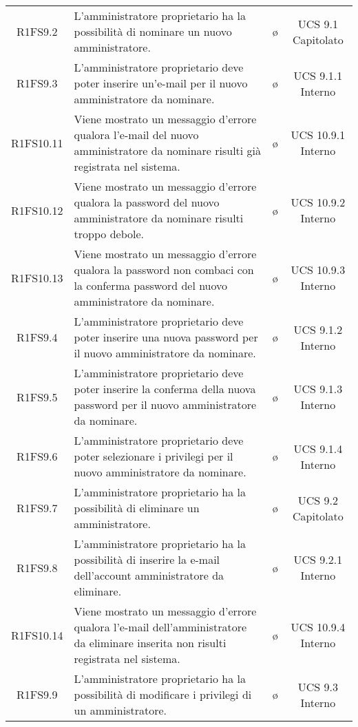 {\begin{longtable}{ c C{6.5cm} c c}
R1FS9.2 & L'amministratore proprietario ha la possibilità di nominare un nuovo amministratore. & \o & UCS 9.1 Capitolato\\

R1FS9.3 & L'amministratore proprietario deve poter inserire un'e-mail per il nuovo amministratore da nominare. & \o & UCS 9.1.1 Interno\\

R1FS10.11 & Viene mostrato un messaggio d'errore qualora l'e-mail del nuovo amministratore da nominare risulti già registrata nel sistema. & \o & UCS 10.9.1 Interno\\

R1FS10.12 & Viene mostrato un messaggio d'errore qualora la password del nuovo amministratore da nominare risulti troppo debole. & \o & UCS 10.9.2 Interno\\

R1FS10.13 & Viene mostrato un messaggio d'errore qualora la password non combaci con la conferma password del nuovo amministratore da nominare. & \o & UCS 10.9.3 Interno\\

R1FS9.4 & L'amministratore proprietario deve poter inserire una nuova password per il nuovo amministratore da nominare. & \o & UCS 9.1.2 Interno\\

R1FS9.5 & L'amministratore proprietario deve poter inserire la conferma della nuova password per il nuovo amministratore da nominare. & \o & UCS 9.1.3 Interno\\

R1FS9.6 & L'amministratore proprietario deve poter selezionare i privilegi per il nuovo amministratore da nominare. & \o & UCS 9.1.4 Interno\\

R1FS9.7 & L'amministratore proprietario ha la possibilità di eliminare un amministratore. & \o & UCS 9.2 Capitolato\\

R1FS9.8 & L'amministratore proprietario ha la possibilità di inserire la e-mail dell'account amministratore da eliminare. & \o & UCS 9.2.1 Interno\\

R1FS10.14 & Viene mostrato un messaggio d'errore qualora l'e-mail dell'amministratore da eliminare inserita non risulti registrata nel sistema. & \o & UCS 10.9.4 Interno\\

R1FS9.9 & L'amministratore proprietario ha la possibilità di modificare i privilegi di un amministratore. & \o & UCS 9.3 Interno\\


\end{longtable}}
